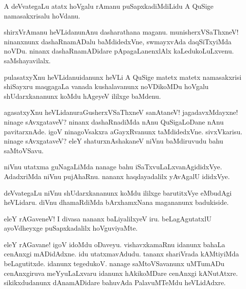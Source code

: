 \begin{mng}
A deVvategaLu atatx hoVgalu rAmanu puSapxkadiMdiLidu A QuSige namasakxrisalu hoVdanu.
\end{mng}

\begin{mng}
shirxVrAmanu heVLidanu\mdash nAnu dasharathana maganu. munisherxVSaThxneV! ninanxnunx dashaRnamADalu baMdidedxVne, swmayxvAda daqSiTxyiMda noVDu. ninanx dashaRnamADidare pApagaLanenxlAlx kaLedukoLuLxvenu. saMshayavilalx.
\end{mng}

\begin{mng}
pulasatxyXnu heVLidanu\mdash idanunx heVLi A QuSige matetx matetx namasakxrisi shiSayxru maqgagaLa vanada kushalavanunx noVDikoMDu hoVgalu shUdarxkananunx koMdu hAgeyeV ililxge baMdenu.
\end{mng}

\begin{mng}
agasatxyXnu heVLidanu\mdash raGusherxVSaThxneV sanAtaneV! jagadavxMdayxne! ninage sAvxgataveV? ninanx dashaRnadiMda nAnu QuSigaLoDane nAnu pavitarxnAde. igoV ninagoVsakxra aGayxRvanunx taMdidedxVne. sivxVkarisu. ninage sAvxgataveV? eleY shaturxnAshakaneV niVnu baMdiruvudu bahu saMtoVSavu.
\end{mng}

\begin{mng}
niVnu utatxma guNagaLiMda nanage bahu iSaTxvuLaLxvanAgididxVye. AdadxriMda niVnu pujAhaRnu. nananx haqdayadalilx yAvAgalU ididxVye.
\end{mng}

\begin{mng}
deVvategaLu niVnu shUdarxkananunx koMdu ililxge barutitxVye eMbudAgi heVLidaru. diVnu dhamaRdiMda bArxhamxNana magananunx badukiside.
\end{mng}

\begin{mng}
eleY rAGaveneV! I divasa nananx baLiyalilxyeV iru. beLagAgutatxlU ayoVdheyxge puSapxkadalilx hoVguviyaMte.
\end{mng}

\begin{mng}
eleY rAGavane! igoV idoMdu oDaveyu. vishavxkamaRnu idanunx bahaLa cenAnxgi mADidAdxne. idu utatxmavAdudu. tananx shariVrada kAMtiyiMda beLagutitxde. idanunx tegedukoV. nanage saMtoVSavanunx uMTumADu cenAnxgiruva meYyuLaLxvaru idanunx hAkikoMDare cenAnxgi kANutAtxre. sikikxdudanunx dAnamADidare bahuvAda PalavuMTeMdu heVLidAdxre.
\end{mng}

